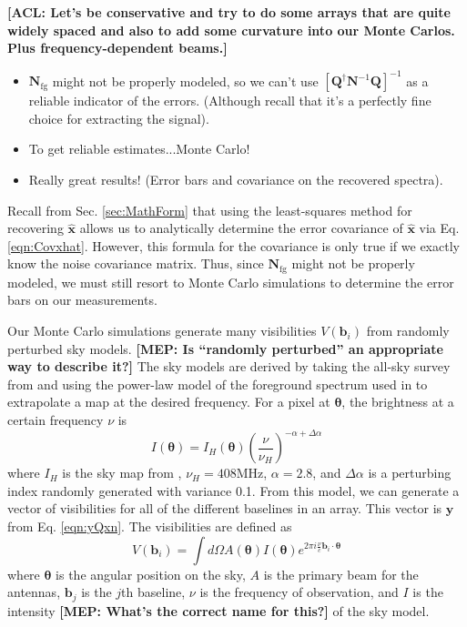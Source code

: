 \documentclass[twolcolumn,apj]{emulateapj}
\newcommand{\xhat}{\hat{\mathbf{x}}}
\newcommand{\y}{\mathbf{y}}
\newcommand{\Nfg}{\mathbf{N}_{\textrm{fg}}}
\newcommand{\acl}[1]{{\color{red} \textbf{[ACL:  #1]}}}
\newcommand{\mep}[1]{{\color{applegreen} \textbf{[MEP:  #1]}}}
\begin{document}
\acl{Let's be conservative and try to do some arrays that are quite widely spaced and also to add some curvature into our Monte Carlos.  Plus frequency-dependent beams.}

\begin{itemize}
\item $\mathbf{N}_\textrm{fg}$ might not be properly modeled, so we can't use $[\mathbf{Q}^\dagger \mathbf{N}^{-1} \mathbf{Q}]^{-1}$ as a reliable indicator of the errors.  (Although recall that it's a perfectly fine choice for extracting the signal).
\item To get reliable estimates...Monte Carlo!
\item Really great results! (Error bars and covariance on the recovered spectra).
\end{itemize}

Recall from Sec. \ref{sec:MathForm} that using the least-squares method for recovering $\xhat$ allows us to analytically determine the error covariance of $\xhat$ via Eq. \eqref{eqn:Covxhat}. However, this formula for the covariance is only true if we exactly know the noise covariance matrix. Thus, since $\Nfg$ might not be properly modeled, we must still resort to Monte Carlo simulations to determine the error bars on our measurements. 

Our Monte Carlo simulations generate many visibilities $V(\mathbf{b}_i)$ from randomly perturbed sky models. \mep{Is ``randomly perturbed'' an appropriate way to describe it?} The sky models are derived by taking the all-sky survey from \citet{Haslam_408MHz_map} and using the power-law model of the foreground spectrum used in \citet{Liu_21cm_Fg} to extrapolate a map at the desired frequency. For a pixel at $\boldsymbol \theta$, the brightness at a certain frequency $\nu$ is 
\begin{equation}
I(\boldsymbol \theta) = I_H(\boldsymbol \theta) \left ( \frac{\nu}{\nu_H} \right ) ^{-\alpha + \Delta \alpha}
\end{equation}
where $I_H$ is the sky map from \citet{Haslam_408MHz_map}, $\nu_H=408$MHz, $\alpha = 2.8$, and $\Delta \alpha$ is a perturbing index randomly generated with variance 0.1. From this model, we can generate a vector of visibilities for all of the different baselines in an array. This vector is $\y$ from Eq. \eqref{eqn:yQxn}. The visibilities are defined as 
\begin{equation}
V(\mathbf{b}_i) = \int d \Omega A(\boldsymbol \theta) I(\boldsymbol \theta) e^{2\pi i\frac{\nu}{c} \mathbf{b}_i \cdot \boldsymbol \theta}
\end{equation}
where $\boldsymbol \theta$ is the angular position on the sky, $A$ is the primary beam for the antennas, $\mathbf{b_{\textit{j}}}$ is the $j$th baseline, $\nu$ is the frequency of observation, and $I$ is the intensity \mep{What's the correct name for this?} of the sky model. 
\end{document}
